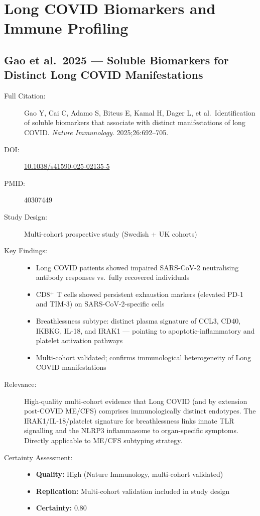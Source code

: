 \section{Long COVID Biomarkers and Immune Profiling}
\label{sec:bib-long-covid-biomarkers-2026}

\subsection{Gao et al.\ 2025 --- Soluble Biomarkers for Distinct Long COVID Manifestations}

\begin{description}
    \item[Full Citation:] Gao Y, Cai C, Adamo S, Biteus E, Kamal H, Dager L, et al.\ Identification of soluble biomarkers that associate with distinct manifestations of long COVID. \textit{Nature Immunology}. 2025;26:692--705. \cite{Gao2025LongCovidBiomarkers}
    \item[DOI:] \href{https://doi.org/10.1038/s41590-025-02135-5}{10.1038/s41590-025-02135-5}
    \item[PMID:] 40307449
    \item[Study Design:] Multi-cohort prospective study (Swedish + UK cohorts)
    \item[Key Findings:]
    \begin{itemize}
        \item Long COVID patients showed impaired SARS-CoV-2 neutralising antibody responses vs.\ fully recovered individuals
        \item CD8$^+$ T cells showed persistent exhaustion markers (elevated PD-1 and TIM-3) on SARS-CoV-2-specific cells
        \item Breathlessness subtype: distinct plasma signature of CCL3, CD40, IKBKG, IL-18, and IRAK1 --- pointing to apoptotic-inflammatory and platelet activation pathways
        \item Multi-cohort validated; confirms immunological heterogeneity of Long COVID manifestations
    \end{itemize}
    \item[Relevance:] High-quality multi-cohort evidence that Long COVID (and by extension post-COVID ME/CFS) comprises immunologically distinct endotypes. The IRAK1/IL-18/platelet signature for breathlessness links innate TLR signalling and the NLRP3 inflammasome to organ-specific symptoms. Directly applicable to ME/CFS subtyping strategy.
    \item[Certainty Assessment:]
    \begin{itemize}
        \item \textbf{Quality:} High (Nature Immunology, multi-cohort validated)
        \item \textbf{Replication:} Multi-cohort validation included in study design
        \item \textbf{Certainty:} 0.80
    \end{itemize}
\end{description}

